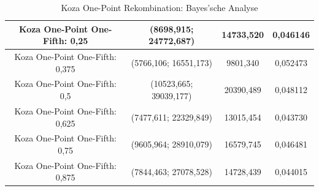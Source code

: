 \begin{table}[H]
\begin{tabular}{c | c | c | c}
		\hline
		Koza One-Point One-Fifth: 0,25 & (8698,915; 24772,687) & 14733,520 & 0,046146\\
		\hline
		Koza One-Point One-Fifth: 0,375 & (5766,106; 16551,173) & 9801,340 & 0,052473\\
		\hline
		Koza One-Point One-Fifth: 0,5 & (10523,665; 39039,177) & 20390,489 & 0,048112\\
		\hline
		Koza One-Point One-Fifth: 0,625 & (7477,611; 22329,849) & 13015,454 & 0,043730\\
		\hline
		Koza One-Point One-Fifth: 0,75 & (9605,964; 28910,079) & 16579,745 & 0,046481\\
		\hline
		Koza One-Point One-Fifth: 0,875 & (7844,463; 27078,528) & 14728,439 & 0,044015\\
	\end{tabular}
	\label{table:kozaOnePointBayesian}
	\caption{Koza One-Point Rekombination: Bayes'sche Analyse}
\end{table}

